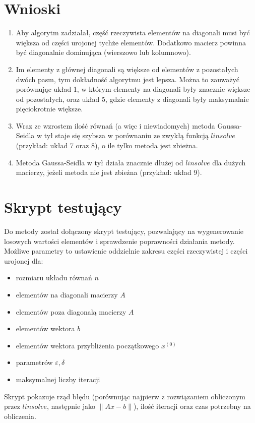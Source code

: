 \documentclass[12pt]{article}
\begin{document}
	\section{Wnioski}
	
	\begin{enumerate}
		\item
			Aby algorytm zadziałał, część rzeczywista elementów na diagonali musi być większa od części urojonej tychże elementów. Dodatkowo macierz powinna być diagonalnie dominująca (wierszowo lub kolumnowo).
			
		\item
			Im elementy z głównej diagonali są większe od elementów z pozostałych dwóch pasm, tym dokładność algorytmu jest lepsza. Można to zauważyć porównując układ 1, w którym elementy na diagonali były znacznie większe od pozostałych, oraz układ 5, gdzie elementy z diagonali były maksymalnie pięciokrotnie większe.
		
		\item
			Wraz ze wzrostem ilość równań (a więc i niewiadomych) metoda Gaussa-Seidla w tył staje się szybsza w porównaniu ze zwykłą funkcją $linsolve$ (przykład: układ 7 oraz 8), o ile tylko metoda jest zbieżna.
		
		\item
			Metoda Gaussa-Seidla w tył działa znacznie dłużej od $linsolve$ dla dużych macierzy, jeżeli metoda nie jest zbieżna (przykład: układ 9).
	\end{enumerate}

	
	\section{Skrypt testujący}
	Do metody został dołączony skrypt testujący, pozwalający na wygenerowanie losowych wartości elementów i sprawdzenie poprawności działania metody. Możliwe parametry to ustawienie oddzielnie zakresu części rzeczywistej i części urojonej dla:
	\begin{itemize}
		\item rozmiaru układu równań $n$
		\item elementów na diagonali macierzy $A$
		\item elementów poza diagonalą macierzy $A$
		\item elementów wektora $b$
		\item elementów wektora przybliżenia początkowego $x^{(0)}$
		\item parametrów $\varepsilon, \delta$
		\item maksymalnej liczby iteracji
	\end{itemize}
	Skrypt pokazuje rząd błędu (porównując najpierw z rozwiązaniem obliczonym przez $linsolve$, następnie jako $\|Ax - b\|$), ilość iteracji oraz czas potrzebny na obliczenia.
	
\end{document}
